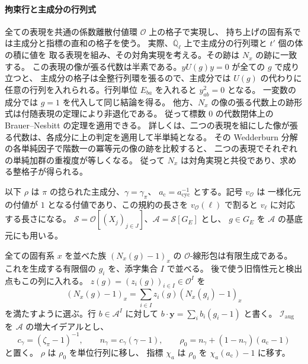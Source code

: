 \paragraph{拘束行と主成分の行列式}
全ての表現を共通の係数離散付値環 \(\mathcal O\) 上の格子で実現し、
持ち上げの固有系では主成分と指標の直和の格子を使う。
実際、\(\overline{\mathbb Q}_\ell\) 上で主成分の行列環と \(t'\) 個の体の積に値を
取る表現を組み、その対角実現を考える。その跡は \(N_x\) の跡に一致する。
この表現の像が張る代数は半素である。\(yU(g)y=0\) が全ての \(g\) で成り立つと、
主成分の格子は全整行列環を張るので、主成分では \(U(g)\) の代わりに
任意の行列を入れられる。行列単位 \(E_{ba}\) を入れると \(y_{ab}^2=0\) となる。
一変数の成分では \(g=1\) を代入して同じ結論を得る。
他方、\(N_x\) の像の張る代数上の跡形式は付随表現の定理により非退化である。
従って標数 \(0\) の代数閉体上の Brauer--Nesbitt の定理を適用できる。
詳しくは、二つの表現を組にした像が張る代数は、各成分に上の判定を適用して半単純となる。
その Wedderburn 分解の各単純因子で階数一の冪等元の像の跡を比較すると、
二つの表現でそれぞれの単純加群の重複度が等しくなる。
従って \(N_x\) は対角実現と共役であり、求める整格子が得られる。

以下 \(\rho\) は \(\pi\) の捻られた主成分、\(\gamma=\gamma_\pi\)、
\(a_{\mathrm c}=a_{\mathrm{cyc}}^{-1}\) とする。記号 \(v_{\mathcal O}\) は
一様化元の付値が \(1\) となる付値であり、この規約の長さを
\(v_{\mathcal O}(\ell)\) で割ると \(v_\ell\) に対応する長さになる。
\(\mathcal S=\mathcal O[(X_j)_{j\in J}]\)、\(\mathcal A=\mathcal S[G_E]\) とし、
\(g\in G_E\) を \(\mathcal A\) の基底元にも用いる。

全ての固有系 \(x\) を並べた族 \((N_x(g)-1)_x\) の
\(\mathcal O\)-線形包は有限生成である。
これを生成する有限個の \(g_i\) を、添字集合 \(I\) で並べる。
後で使う旧惰性元と検出点もこの列に入れる。
\(z(g)=(z_i(g))_{i\in I}\in\mathcal O^I\) を
\[
 (N_x(g)-1)_x=\sum_{i\in I} z_i(g)(N_x(g_i)-1)_x
\]
を満たすように選ぶ。行 \(b\in\mathcal A^I\) に対して
\(b\cdot\mathbf y=\sum_i b_i(g_i-1)\) と書く。
\(\mathcal I_\mathrm{aug}\) を \(\mathcal A\) の増大イデアルとし、
\[
 c_\gamma=(\zeta_\pi-1)^{-1},\qquad n_\gamma=c_\gamma(\gamma-1),
 \qquad \rho_0=n_\gamma+(1-n_\gamma)(a_{\mathrm c}-1)
\]
と置く。 \(\rho\) は \(\rho_0\) を単位行列に移し、
指標 \(\chi_a\) は \(\rho_0\) を \(\chi_a(a_{\mathrm c})-1\) に移す。

